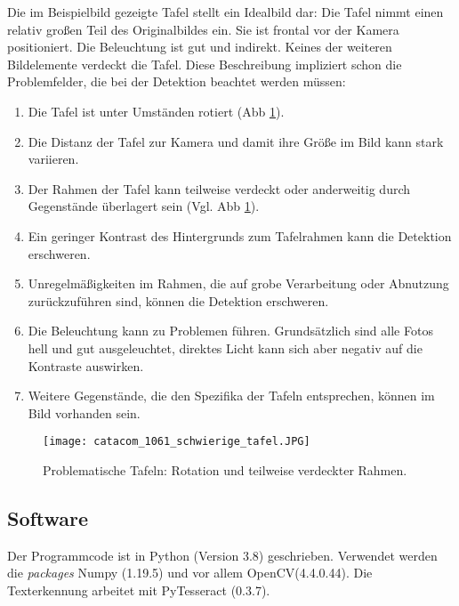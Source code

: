 Die im Beispielbild gezeigte Tafel stellt  ein Idealbild dar: Die Tafel nimmt einen relativ großen Teil des Originalbildes ein. Sie ist frontal vor der Kamera positioniert. Die Beleuchtung ist gut und indirekt. Keines der weiteren Bildelemente verdeckt die Tafel.
Diese Beschreibung impliziert schon die Problemfelder, die bei der Detektion beachtet werden müssen:
\begin{enumerate}
\item Die Tafel ist unter Umständen rotiert (Abb \ref{fig:schwierigetafel}).
\item Die Distanz der Tafel zur Kamera und damit ihre Größe im Bild kann stark variieren.
\item Der Rahmen der Tafel kann teilweise verdeckt oder anderweitig durch Gegenstände überlagert sein (Vgl. Abb \ref{fig:schwierigetafel}).
\item Ein geringer Kontrast des Hintergrunds zum Tafelrahmen kann die Detektion erschweren. %
\item Unregelmäßigkeiten im Rahmen, die auf grobe Verarbeitung oder Abnutzung zurückzuführen sind, können die Detektion erschweren.
\item Die Beleuchtung kann zu Problemen führen. Grundsätzlich sind alle Fotos hell und gut ausgeleuchtet, direktes Licht kann sich aber negativ auf die Kontraste auswirken.
\item Weitere Gegenstände, die den Spezifika der Tafeln entsprechen, können im Bild vorhanden sein.
\end{enumerate}
\begin{figure}[!h]
\centering
\texttt{[image: catacom\_1061\_schwierige\_tafel.JPG]}
\caption{Problematische Tafeln: Rotation und teilweise verdeckter Rahmen.}
\label{fig:schwierigetafel}
\end{figure}

\subsection{Software}

Der Programmcode ist in Python (Version 3.8) geschrieben. Verwendet werden die \textit{packages} Numpy (1.19.5) und vor allem OpenCV(4.4.0.44). Die Texterkennung arbeitet mit PyTesseract (0.3.7).

